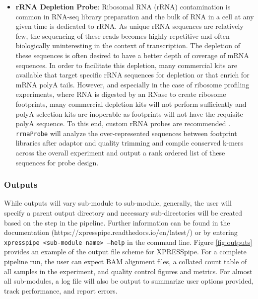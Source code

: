 \documentclass[11pt, a4paper, oneside]{article}
\begin{document}
\begin{enumerate}
\begin{itemize}
      \item \textbf{rRNA Depletion Probe}: Ribosomal RNA (rRNA) contamination is common in RNA-seq library preparation and the bulk of RNA in a cell at any given time is dedicated to rRNA. As unique rRNA sequences are relatively few, the sequencing of these reads becomes highly repetitive and often biologically uninteresting in the context of transcription. The depletion of these sequences is often desired to have a better depth of coverage of mRNA sequences. In order to facilitate this depletion, many commercial kits are available that target specific rRNA sequences for depletion or that enrich for mRNA polyA tails. However, and especially in the case of ribosome profiling experiments, where RNA is digested by an RNase to create ribosome footprints, many commercial depletion kits will not perform sufficiently and polyA selection kits are inoperable as footprints will not have the requisite polyA sequence. To this end, custom rRNA probes are recommended \cite{ingolia_meth, ingolia_science}. \texttt{rrnaProbe} will analyze the over-represented sequences between footprint libraries after adaptor and quality trimming and compile conserved k-mers across the overall experiment and output a rank ordered list of these sequences for probe design.

    \end{itemize}
\end{enumerate}


\subsubsection{Outputs}
While outputs will vary sub-module to sub-module, generally, the user will specify a parent output directory and necessary sub-directories will be created based on the step in the pipeline. Further information can be found in the documentation (https://xpresspipe.readthedocs.io/en/latest/) or by entering \texttt{xpresspipe \textless sub-module name\textgreater \ --help} in the command line. Figure \ref{fig:outputs} provides an example of the output file scheme for XPRESSpipe. For a complete pipeline run, the user can expect BAM alignment files, a collated count table of all samples in the experiment, and quality control figures and metrics. For almost all sub-modules, a log file will also be output to summarize user options provided, track performance, and report errors.
\end{document}
